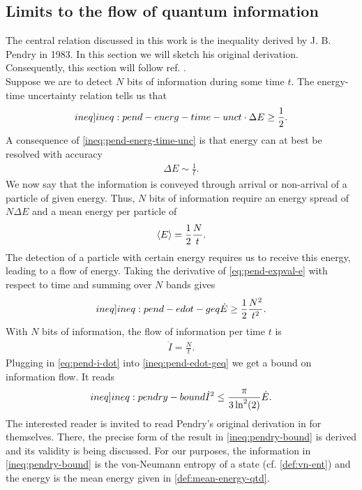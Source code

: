 \documentclass{book}
\numberwithin{equation}{section} %
\begin{document}
\subsection{Limits to the flow of quantum information}
The central relation discussed in this work is the inequality derived by J. B. Pendry in 1983. In this section we will
sketch his original derivation. Consequently, this section will follow ref. \cite{BA_Pendry_1983}.\\
Suppose we are to detect $N$ bits of information during some time $t$. The energy-time uncertainty relation tells us that \cite{BA_Mandelstam1991}
\begin{align}\label[ineq]{ineq:pend-energ-time-unc}
    t\cdot\Delta E \geq \frac{1}{2}.
\end{align}
A consequence of \cref{ineq:pend-energ-time-unc} is that energy can at best be resolved with accuracy
\begin{align}\label{eq:pend-energ-accu}
    \Delta E \sim \frac{1}{t}.
\end{align}
We now say that the information is conveyed through arrival or non-arrival of a particle of given energy.
Thus, $N$ bits of information require an energy spread of $N\Delta E$ and a mean energy per particle of
\begin{align}\label{eq:pend-expval-e}
    \expval{E} = \frac{1}{2}\frac{N}{t}.
\end{align}
The detection of a particle with certain energy requires us to receive this energy, leading to a flow of energy. 
Taking the derivative of \cref{eq:pend-expval-e} with respect to time and summing over $N$ bands gives
\begin{align}\label[ineq]{ineq:pend-edot-geq}
    \dot{E} \geq \frac{1}{2}\frac{N^2}{t^2}.
\end{align}
With $N$ bits of information, the flow of information per time $t$ is
\begin{align}\label{eq:pend-i-dot}
    \dot{I} = \frac{N}{t}.
\end{align}
Plugging in \cref{eq:pend-i-dot} into \cref{ineq:pend-edot-geq} we get a bound on information flow.
It reads
\begin{align}\label[ineq]{ineq:pendry-bound}
    \dot{I}^2 \leq \frac{\pi}{3\ln^2(2)}\dot{E}.
\end{align}
The interested reader is invited to read Pendry's original derivation in \cite{BA_Pendry_1983} for themselves.
There, the precise form of the result in \cref{ineq:pendry-bound} is derived and its validity is being discussed.
For our purposes, the information in \cref{ineq:pendry-bound} is the von-Neumann entropy of a state (cf. \cref{def:vn-ent})
and the energy is the mean energy given in \cref{def:mean-energy-qtd}.
\end{document}
